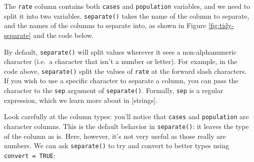 \documentclass[]{book}
\newenvironment{Shaded}{\begin{snugshade}}{\end{snugshade}}
\newcommand{\KeywordTok}[1]{\textcolor[rgb]{0.13,0.29,0.53}{\textbf{#1}}}
\newcommand{\DataTypeTok}[1]{\textcolor[rgb]{0.13,0.29,0.53}{#1}}
\newcommand{\StringTok}[1]{\textcolor[rgb]{0.31,0.60,0.02}{#1}}
\newcommand{\CommentTok}[1]{\textcolor[rgb]{0.56,0.35,0.01}{\textit{#1}}}
\newcommand{\OtherTok}[1]{\textcolor[rgb]{0.56,0.35,0.01}{#1}}
\newcommand{\OperatorTok}[1]{\textcolor[rgb]{0.81,0.36,0.00}{\textbf{#1}}}
\newcommand{\NormalTok}[1]{#1}
\let\BeginKnitrBlock\begin \let\EndKnitrBlock\end
\begin{document}
The \texttt{rate} column contains both \texttt{cases} and
\texttt{population} variables, and we need to split it into two
variables. \texttt{separate()} takes the name of the column to separate,
and the names of the columns to separate into, as shown in Figure
\ref{fig:tidy-separate} and the code below.

\begin{Shaded}
\end{Shaded}

\BeginKnitrBlock{rmdimportant}
By default, \texttt{separate()} will split values wherever it sees a
non-alphanumeric character (i.e.~a character that isn't a number or
letter). For example, in the code above, \texttt{separate()} split the
values of \texttt{rate} at the forward slash characters. If you wish to
use a specific character to separate a column, you can pass the
character to the \texttt{sep} argument of \texttt{separate()}. Formally,
\texttt{sep} is a regular expression, which we learn more about in
{[}strings{]}.
\EndKnitrBlock{rmdimportant}

Look carefully at the column types: you'll notice that \texttt{cases}
and \texttt{population} are character columns. This is the default
behavior in \texttt{separate()}: it leaves the type of the column as is.
Here, however, it's not very useful as those really are numbers. We can
ask \texttt{separate()} to try and convert to better types using
\texttt{convert\ =\ TRUE}:

\begin{Shaded}
\end{Shaded}
\end{document}
